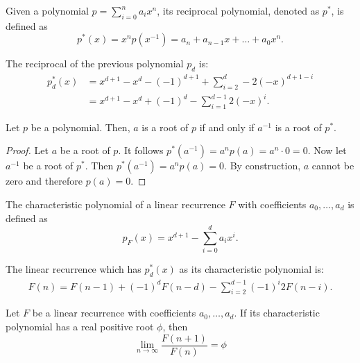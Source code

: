 \documentclass[english,version-2020-11]{uzl-thesis}
\begin{document}
\begin{definition}
  Given a polynomial $p = \sum_{i=0}^n a_i x^n$, its reciprocal polynomial,
  denoted as $p^*$, is defined as
  \[
    p^*(x) = x^n p(x^{-1}) = a_n + a_{n-1} x + \dots + a_0 x^n.
  \]
\end{definition}

\begin{example}
  The reciprocal of the previous polynomial $p_d$ is:
  \begin{align*}
    p_d^*(x) & = x^{d+1} - x^d - (-1)^{d+1} + \sum_{i = 2}^{d} -2 (-x)^{d + 1 - i} \\
             & = x^{d+1} - x^d + (-1)^d - \sum_{i = 1}^{d - 1} 2 (-x)^i.
  \end{align*}
\end{example}

\begin{lemma}
  Let $p$ be a polynomial. Then, $a$ is a root of $p$ if and only if $a^{-1}$ is a root of $p^*$.
\end{lemma}

\begin{proof}
  Let $a$ be a root of $p$. It follows $p^*(a^{-1}) = a^n p(a) = a^n \cdot 0 = 0$.
  Now let $a^{-1}$ be a root of $p^*$. Then $p^*(a^{-1}) = a^n p(a) = 0$.
  By construction, $a$ cannot be zero and therefore $p(a) = 0$.
\end{proof}

\begin{definition}
  The characteristic polynomial of a linear recurrence $F$ with coefficients
  $a_0, \dots, a_d$ is defined as
  \[
    p_F(x) = x^{d+1} - \sum_{i = 0}^d a_i x^i.
  \]
\end{definition}

\begin{example}
  The linear recurrence which has $p_d^*(x)$ as its characteristic polynomial is:
  \begin{align*}
    F(n) = F(n - 1) + (-1)^d F(n - d) - \sum_{i=2}^{d - 1} (-1)^{i} 2 F(n - i).
  \end{align*}
\end{example}

\begin{lemma}
  Let $F$ be a linear recurrence with coefficients $a_0, \dots, a_d$.
  If its characteristic polynomial has a real positive root $\phi$, then
  \[
    \lim_{n \to \infty} \frac{F(n + 1)}{F(n)} = \phi
  \]
\end{lemma}
\end{document}
